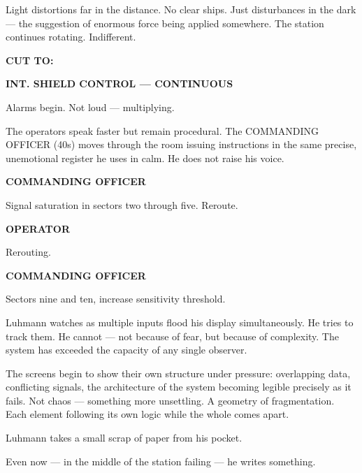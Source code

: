 \documentclass[12pt]{article}
\newcommand{\sceneheading}[1]{%
  \vspace{10pt}%
  \noindent\textbf{#1}%
  \vspace{6pt}%
}
\newcommand{\trans}[1]{%
  \vspace{8pt}%
  \begin{flushright}\textbf{#1}\end{flushright}%
  \vspace{4pt}%
}
\newcommand{\character}[1]{%
  \vspace{8pt}%
  \begin{center}\textbf{#1}\end{center}%
  \vspace{-4pt}%
}
\newenvironment{dialogue}{%
  \begin{center}%
  \begin{minipage}{0.62\textwidth}%
}{%
  \end{minipage}%
  \end{center}%
  \vspace{4pt}%
}
\newenvironment{action}{%
  \vspace{4pt}%
  \noindent\ignorespaces%
}{%
  \vspace{6pt}%
}
\begin{document}
\begin{action}
Light distortions far in the distance. No clear ships. Just disturbances in the dark — the suggestion of enormous force being applied somewhere. The station continues rotating. Indifferent.
\end{action}

\trans{CUT TO:}

\sceneheading{INT. SHIELD CONTROL — CONTINUOUS}

\begin{action}
Alarms begin. Not loud — multiplying.

\medskip

The operators speak faster but remain procedural. The COMMANDING OFFICER (40s) moves through the room issuing instructions in the same precise, unemotional register he uses in calm. He does not raise his voice.
\end{action}

\character{COMMANDING OFFICER}
\begin{dialogue}
Signal saturation in sectors two through five. Reroute.
\end{dialogue}

\character{OPERATOR}
\begin{dialogue}
Rerouting.
\end{dialogue}

\character{COMMANDING OFFICER}
\begin{dialogue}
Sectors nine and ten, increase sensitivity threshold.
\end{dialogue}

\begin{action}
Luhmann watches as multiple inputs flood his display simultaneously. He tries to track them. He cannot — not because of fear, but because of complexity. The system has exceeded the capacity of any single observer.

\medskip

The screens begin to show their own structure under pressure: overlapping data, conflicting signals, the architecture of the system becoming legible precisely as it fails. Not chaos — something more unsettling. A geometry of fragmentation. Each element following its own logic while the whole comes apart.

\medskip

Luhmann takes a small scrap of paper from his pocket.

Even now — in the middle of the station failing — he writes something.
\end{action}
\end{document}
